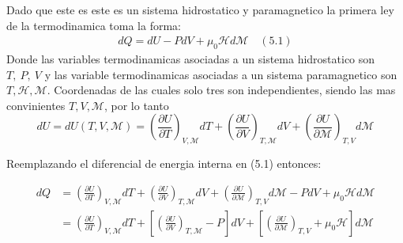 \documentclass[a4paper]{article}
\begin{document}
    \begin{answer}[Punto 5]
        Dado que este es este es un sistema hidrostatico y paramagnetico la primera ley de la termodinamica toma la forma:
        \begin{align*}
            dQ = dU - PdV + \mu_0 \mathscr Hd\mathscr{M} \quad (5.1)
        \end{align*}
        Donde las variables termodinamicas asociadas a un sistema hidrostatico son $T,~P,~V$ y las variable termodinamicas asociadas a un sistema paramagnetico son $T, \mathscr{H}, \mathscr{M}$.
        Coordenadas de las cuales solo tres son independientes, siendo las mas convinientes $T,V,\mathscr M$, por lo tanto 
        $$dU = dU(T,V, \mathscr{M}) =  \left(\frac{\partial U}{\partial T}\right)_{V, \mathscr{M}} dT +\left(\frac{\partial U}{\partial V}\right)_{T, \mathscr{M}} dV + \left(\frac{\partial U}{\partial \mathscr{M}}\right)_{T,V} d\mathscr{M}$$ 

        Reemplazando el diferencial de energia interna en (5.1) entonces:

        \begin{align*}
            dQ &=  \left(\frac{\partial U}{\partial T}\right)_{V, \mathscr{M}} dT +\left(\frac{\partial U}{\partial V}\right)_{T, \mathscr{M}} dV + \left(\frac{\partial U}{\partial \mathscr{M}}\right)_{T,V} d\mathscr{M} - PdV + \mu_0 \mathscr H d\mathscr M\\
             &= \left(\frac{\partial U}{\partial T}\right)_{V, \mathscr{M}} dT + \left[\left(\frac{\partial U}{\partial V}\right)_{T, \mathscr{M}} - P \right]dV + \left[\left(\frac{\partial U}{\partial \mathscr{M} } \right)_{T,V} + \mu_0\mathscr H\right] d\mathscr M
        \end{align*}
    \end{answer}
    
\end{document}
